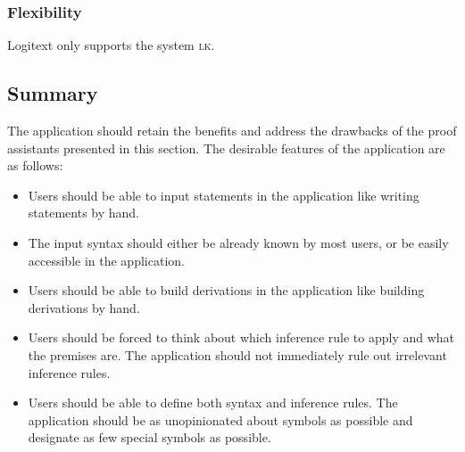 \subsubsection{Flexibility}
Logitext only supports the system \textsc{lk}.

\subsection{Summary}
The application should retain the benefits and address the drawbacks of the proof assistants presented in this section. The desirable features of the application are as follows:
\begin{itemize}
    \item Users should be able to input statements in the application like writing statements by hand.
    \item The input syntax should either be already known by most users, or be easily accessible in the application.
    \item Users should be able to build derivations in the application like building derivations by hand.
    \item Users should be forced to think about which inference rule to apply and what the premises are. The application should not immediately rule out irrelevant inference rules.
    \item Users should be able to define both syntax and inference rules. The application should be as unopinionated about symbols as possible and designate as few special symbols as possible.
\end{itemize}